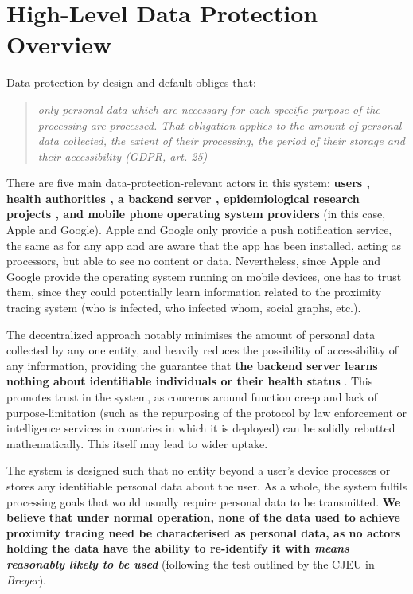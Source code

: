 \documentclass[12pt,a4paper]{article}
\begin{document}
\section*{High-Level Data Protection Overview}
Data protection by design and default obliges that:
\begin{quote}
\textit{only personal data which are necessary for each specific purpose of the
processing are processed. That obligation applies to the amount of personal
data collected, the extent of their processing, the period of their storage and
their accessibility (GDPR, art. 25)}
\end{quote}
There are five main data-protection-relevant actors in this system: \textbf{users , health
authorities , a backend server , epidemiological research projects , and mobile phone
operating system providers} (in this case, Apple and Google). Apple and Google only
provide a push notification service, the same as for any app and are aware that the app has been installed, acting as processors, but able to see no content or data. Nevertheless, since Apple and Google provide the operating system running on mobile devices, one has to trust them, since they could potentially learn information related to the proximity tracing system (who is infected, who infected whom, social graphs, etc.).


The decentralized approach notably minimises the amount of personal data collected by any
one entity, and heavily reduces the possibility of accessibility of any information, providing the guarantee that \textbf{the backend server learns nothing about identifiable individuals or their health status} . This promotes trust in the system, as concerns around function creep and lack of purpose-limitation (such as the repurposing of the protocol by law enforcement or intelligence services in countries in which it is deployed) can be solidly rebutted mathematically. This itself may lead to wider uptake.


The system is designed such that no entity beyond a user’s device processes or stores any
identifiable personal data about the user. As a whole, the system fulfils processing goals that would usually require personal data to be transmitted. \textbf{We believe that under normal operation, none of the data used to achieve proximity tracing need be characterised
as personal data, as no actors holding the data have the ability to re-identify it with
\textit{means reasonably likely to be used}} (following the test outlined by the CJEU in \textit{Breyer}).
\end{document}

